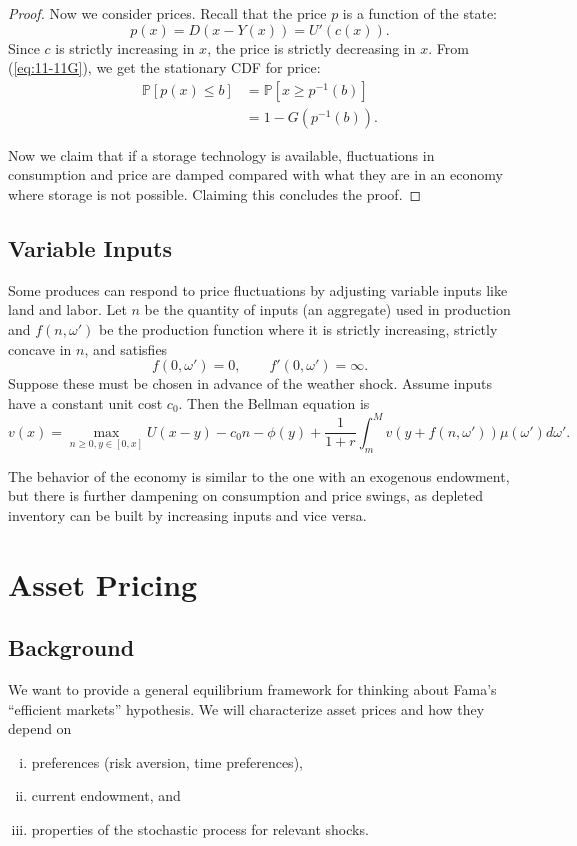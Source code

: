 \documentclass{tufte-handout}
\renewcommand*\P{\mathbb{P}}
\theoremstyle{definition}
\begin{document}
\begin{proof}
	Now we consider prices. Recall that the price $p$ is a function of the state: \[
		p(x) = D(x-Y(x)) = U'(c(x))
	.\] Since $c$ is strictly increasing in $x$, the price is strictly decreasing in $x$. From (\ref{eq:11-11G}), we get the stationary CDF for price:
	\begin{align*}
		\P\left[p(x) \le b \right] &= \P\left[x \ge p^{-1}(b)\right]  \\
								  &= 1- G(p^{-1}(b))
	.\end{align*}

	Now we claim that if a storage technology is available, fluctuations in consumption and price are damped compared with what they are in an economy where storage is not possible. Claiming this concludes the proof.
\end{proof}

\subsection{Variable Inputs}
Some produces can respond to price fluctuations by adjusting variable inputs like land and labor.
Let $n$ be the quantity of inputs (an aggregate) used in production and $f(n,\omega')$ be the production function where it is strictly increasing, strictly concave in $n$, and satisfies \[
f(0,\omega') = 0, \qquad f'(0,\omega') = \infty
.\] 
Suppose these must be chosen in advance of the weather shock.
Assume inputs have a constant unit cost $c_0$. Then the Bellman equation is \[
 v\left(x \right) = \max_{n\ge 0, y\in[0,x]} U(x-y) - c_0 n - \phi(y) + \frac{1}{1+r} \int_{m}^{M} v(y+ f(n,\omega'))\mu(\omega')d\omega' 
.\] 

The behavior of the economy is similar to the one with an exogenous endowment, but there is further dampening on consumption and price swings, as depleted inventory can be built by increasing inputs and vice versa.

\section{Asset Pricing}

\subsection{Background}

We want to provide a general equilibrium framework for thinking about Fama's ``efficient markets'' hypothesis. We will characterize asset prices and how they depend on 
\begin{enumerate}[(i)]
	\item preferences (risk aversion, time preferences),
	\item current endowment, and
	\item properties of the stochastic process for relevant shocks.
\end{enumerate}
\end{document}
